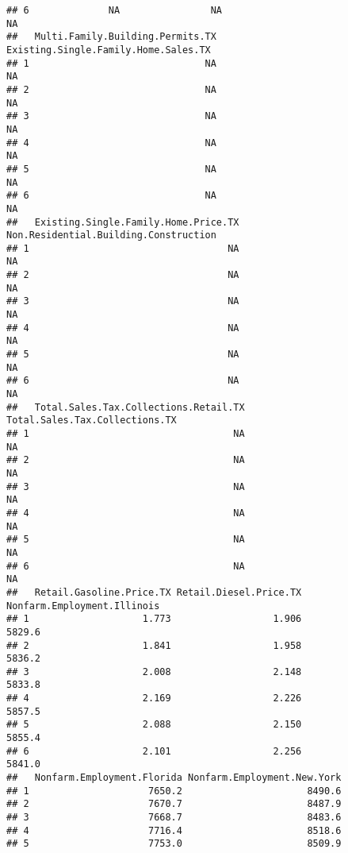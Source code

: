 \documentclass[
]{article}
\begin{document}
\begin{verbatim}
## 6              NA                NA                                NA
##   Multi.Family.Building.Permits.TX Existing.Single.Family.Home.Sales.TX
## 1                               NA                                   NA
## 2                               NA                                   NA
## 3                               NA                                   NA
## 4                               NA                                   NA
## 5                               NA                                   NA
## 6                               NA                                   NA
##   Existing.Single.Family.Home.Price.TX Non.Residential.Building.Construction
## 1                                   NA                                    NA
## 2                                   NA                                    NA
## 3                                   NA                                    NA
## 4                                   NA                                    NA
## 5                                   NA                                    NA
## 6                                   NA                                    NA
##   Total.Sales.Tax.Collections.Retail.TX Total.Sales.Tax.Collections.TX
## 1                                    NA                             NA
## 2                                    NA                             NA
## 3                                    NA                             NA
## 4                                    NA                             NA
## 5                                    NA                             NA
## 6                                    NA                             NA
##   Retail.Gasoline.Price.TX Retail.Diesel.Price.TX Nonfarm.Employment.Illinois
## 1                    1.773                  1.906                      5829.6
## 2                    1.841                  1.958                      5836.2
## 3                    2.008                  2.148                      5833.8
## 4                    2.169                  2.226                      5857.5
## 5                    2.088                  2.150                      5855.4
## 6                    2.101                  2.256                      5841.0
##   Nonfarm.Employment.Florida Nonfarm.Employment.New.York
## 1                     7650.2                      8490.6
## 2                     7670.7                      8487.9
## 3                     7668.7                      8483.6
## 4                     7716.4                      8518.6
## 5                     7753.0                      8509.9

\end{verbatim}
\end{document}
